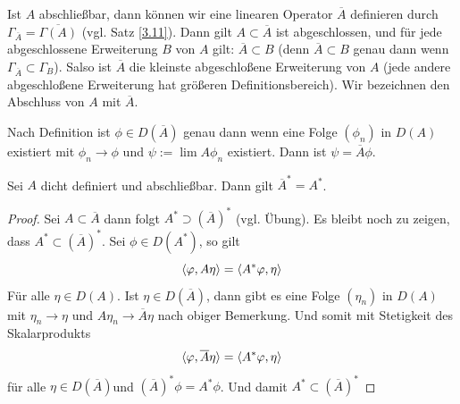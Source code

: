\documentclass{mycourse}
\begin{document}
Ist $A$ abschließbar, dann können wir eine linearen Operator $\overline{A}$ definieren durch $\Gamma_{\overline{A}} = \overline{\Gamma(A)}$ (vgl. Satz \ref{3.11}). Dann gilt $A\subset \overline{A}$ ist abgeschlossen, und für jede abgeschlossene Erweiterung $B$ von $A$ gilt: $\overline{A} \subset B$ (denn $\overline{A}\subset B$ genau dann wenn $\Gamma_{\overline{A}} \subset \Gamma_B$). Salso ist $\overline{A}$ die kleinste abgeschloßene Erweiterung  von $A$ (jede andere abgeschloßene Erweiterung hat größeren Definitionsbereich). Wir bezeichnen den Abschluss von $A$ mit $\overline{A}$. 

Nach Definition ist $\phi \in D(\overline{A})$ genau dann wenn eine Folge $(\phi_n)$ in $D(A)$ existiert mit $\phi_n \to \phi$ und $\psi:= \lim A\phi_n$ existiert. Dann ist $\psi= \overline A\phi$.

\begin{lem}\label{3.12}
Sei $A$ dicht definiert und abschließbar. Dann gilt $\overline{A}^*=A^*$.
\end{lem}
\begin{proof}
Sei $A\subset \overline{A}$ dann folgt $A^* \supset (\overline{A})^*$ (vgl. Übung). Es bleibt noch zu zeigen, dass $A^*\subset(\overline{A})^*$. Sei $\phi \in D(A^*)$, so gilt
\[
\langle \varphi, A \eta\rangle =\langle A^* \varphi, \eta\rangle
\]
Für alle $\eta \in D(A)$. Ist $\eta \in D(\overline A)$, dann gibt es eine Folge $(\eta_n)$ in $D(A)$ mit $\eta_n \to \eta$ und $A\eta_n \to \overline{A}\eta$ nach obiger Bemerkung. Und somit mit Stetigkeit des Skalarprodukts
\[
\langle \varphi, \overline{A}\eta\rangle = \langle A^* \varphi, \eta\rangle
\]
für alle $\eta \in D(\overline{A})$und $(\overline{A})^*\phi = A^*\phi$. Und damit $A^*\subset (\overline{A})^*$
\end{proof}
\end{document}
